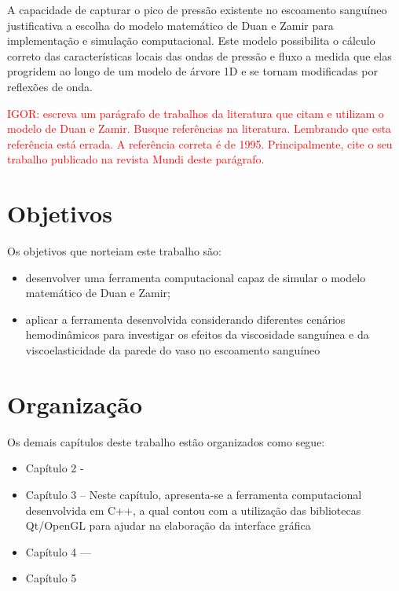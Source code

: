 \documentclass[a4paper,12pt]{monografia}
\theoremstyle{plain}
\theoremstyle{definition}
\theoremstyle{remark}
\begin{document}
A capacidade de capturar o pico de pressão existente no escoamento sanguíneo justificativa a escolha do modelo matemático de Duan e Zamir para implementação e simulação computacional. Este modelo possibilita o cálculo correto das características locais das ondas de pressão e fluxo a medida que elas progridem ao longo de um modelo de árvore 1D e se tornam modificadas por reflexões de onda.

\textcolor{red}{IGOR: escreva um parágrafo de trabalhos da literatura que citam e utilizam o modelo de Duan e Zamir. Busque referências na literatura. Lembrando que esta referência \cite{Duan} está errada. A referência correta é de 1995. Principalmente, cite o seu trabalho publicado na revista Mundi deste parágrafo.}

\section{Objetivos}\label{sec:obj}

Os objetivos que norteiam este trabalho são:
\begin{itemize}
	\item desenvolver uma ferramenta computacional capaz de simular o modelo matemático de Duan e Zamir;
	\item aplicar a ferramenta desenvolvida considerando diferentes cenários hemodinâmicos para investigar os efeitos da viscosidade sanguínea e da viscoelasticidade da parede do vaso no escoamento sanguíneo
\end{itemize}

\section{Organização}\label{sec:org}

Os demais capítulos deste trabalho estão organizados como segue:
\begin{itemize}
	\item Capítulo 2 -
	
	\item Capítulo 3 --
	Neste capítulo, apresenta-se a ferramenta computacional desenvolvida em C++,  a qual contou com a utilização das bibliotecas Qt/OpenGL para ajudar na elaboração da interface gráfica
	\item Capítulo 4 ---
	
	\item Capítulo 5
\end{itemize}
\end{document}

